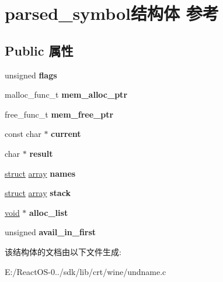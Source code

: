 \hypertarget{structparsed__symbol}{}\section{parsed\+\_\+symbol结构体 参考}
\label{structparsed__symbol}
\subsection*{Public 属性}
\begin{DoxyCompactItemize}
\item 
\mbox{\label{structparsed__symbol_a45c52a88a1a10641088b3a8954ad9f40}} 
unsigned {\bfseries flags}
\item 
\mbox{\label{structparsed__symbol_a38c8c5c9c6e263c79d5245062a8c833f}} 
malloc\+\_\+func\+\_\+t {\bfseries mem\+\_\+alloc\+\_\+ptr}
\item 
\mbox{\label{structparsed__symbol_abb6d4df000d3fb9889c58f147271659c}} 
free\+\_\+func\+\_\+t {\bfseries mem\+\_\+free\+\_\+ptr}
\item 
\mbox{\label{structparsed__symbol_a8a9ba228162e2498c037be87e0e78698}} 
const char $\ast$ {\bfseries current}
\item 
\mbox{\label{structparsed__symbol_ab1ad78a191403c3c9ac5ee4df68604a7}} 
char $\ast$ {\bfseries result}
\item 
\mbox{\label{structparsed__symbol_ae5a8c61f4ab326eeb44b1a1842d99b32}} 
\hyperlink{interfacestruct}{struct} \hyperlink{structarray}{array} {\bfseries names}
\item 
\mbox{\label{structparsed__symbol_a890b7c66528200441fd1640fbff47054}} 
\hyperlink{interfacestruct}{struct} \hyperlink{structarray}{array} {\bfseries stack}
\item 
\mbox{\label{structparsed__symbol_a0bfacc1a82c05d737b530ea8506e9e6c}} 
\hyperlink{interfacevoid}{void} $\ast$ {\bfseries alloc\+\_\+list}
\item 
\mbox{\label{structparsed__symbol_ab2aa22d2814c918c3030077cbaf9114e}} 
unsigned {\bfseries avail\+\_\+in\+\_\+first}
\end{DoxyCompactItemize}


该结构体的文档由以下文件生成\+:\begin{DoxyCompactItemize}
\item 
E\+:/\+React\+O\+S-\/0../sdk/lib/crt/wine/undname.\+c\end{DoxyCompactItemize}
